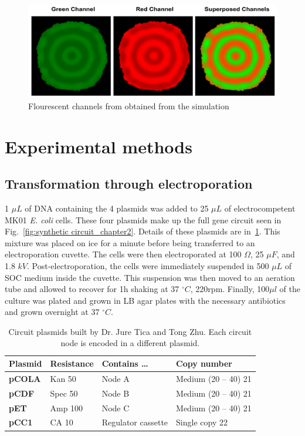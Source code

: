 \begin{figure}[H]

    \includegraphics[width=1\textwidth]{chapters/Methods/redgreesupersposed}
    \caption{Flourescent channels from obtained from the simulation}
    \label{redgreesupersposed}
\end{figure}




\section{Experimental methods}
\subsection{Transformation through electroporation}\label{electroporation}
1 $\mu L$ of DNA containing the 4 plasmids was added to 25 $\mu L$ of electrocompetent MK01 \textit{E. coli} cells.
These four plasmids make up the full gene circuit seen in Fig.~\ref{fig:synthetic circuit_chapter2}.
Details of these plasmids are in~\ref{tab:plasmid table}.
This mixture was placed on ice for a minute before being transferred to an electroporation cuvette.
The cells were then electroporated at 100 $\Omega$, 25 $\mu F$, and 1.8 $kV$.
Post-electroporation, the cells were immediately suspended in 500 $\mu L$ of SOC medium inside the cuvette.
This suspension was then moved to an aeration tube and allowed to recover for 1h shaking at 37 $^{\circ} C$, 220rpm.
Finally, 100$\mu l$ of the culture was plated and grown in LB agar plates with the necessary antibiotics and grown overnight at 37 $^{\circ} C$.

\begin{table}[H]
    \centering
    \begin{tabular}{llll}
        \toprule
        \textbf{Plasmid} & \textbf{Resistance} & \textbf{Contains …} & \textbf{Copy number} \\
        \midrule
        \textbf{pCOLA} & Kan 50 & Node A & Medium (20 – 40) 21 \\
        \textbf{pCDF} & Spec 50 & Node B & Medium (20 – 40) 21 \\
        \textbf{pET} & Amp 100 & Node C & Medium (20 – 40) 21 \\
        \textbf{pCC1} & CA 10 & Regulator cassette & Single copy 22 \\
        \bottomrule
    \end{tabular}
    \caption{Circuit plasmids built by Dr. Jure Tica and Tong Zhu. Each circuit node is encoded in a different plasmid.}
    \label{tab:plasmid table}
\end{table}



